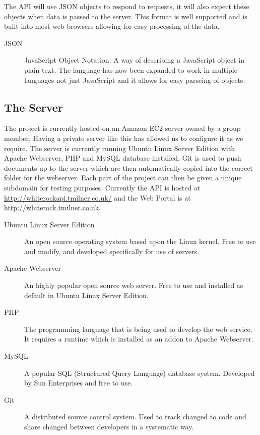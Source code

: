 \documentclass[11pt,a4paper]{article}
\begin{document}
The API will use JSON objects to respond to requests, it will also expect these objects when data is passed to the server. This format is well supported and is built into most web browsers allowing for easy processing of the data.

\begin{description}
\item[JSON] JavaScript Object Notation. A way of describing a JavaScript object in plain text. The language has now been expanded to work in multiple languages not just JavaScript and it allows for easy parseing of objects. 
\end{description}

\subsection{The Server}
\label{sec:techServer}
The project is currently hosted on an Amazon EC2 server owned by a group member. Having a private server like this has allowed us to configure it as we require. The server is currently running Ubuntu Linux Server Edition with Apache Webserver, PHP and MySQL database installed. Git is used to push documents up to the server which are then automatically copied into the correct folder for the webserver. Each part of the project can then be given a unique subdomain for testing purposes. Currently the API is hosted at \url{http://whiterockapi.tmilner.co.uk/} and the Web Portal is at \url{http://whiterock.tmilner.co.uk}.

\begin{description}
\item[Ubuntu Linux Server Edition] An open source operating system based upon the Linux kernel. Free to use and modify, and developed specifically for use of servers. 

\item[Apache Webserver] An highly popular open source web server. Free to use and installed as default in Ubuntu Linux Server Edition.

\item[PHP] The programming language that is being used to develop the web service. It requires a runtime which is installed as an addon to Apache Webserver. 

\item[MySQL] A popular SQL (Structured Query Language) database system. Developed by Sun Enterprises and free to use. 

\item[Git] A distributed source control system. Used to track changed to code and share changed between developers in a systematic way. 
\end{description}
\end{document}
